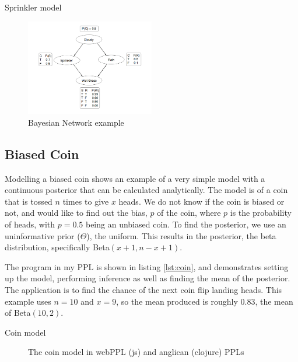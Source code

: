 \begin{listing}[!ht]
	\caption{Sprinkler model}
	\label{lst:sprinkler}
\end{listing}

\begin{figure}[!htb]
	\centering
	\includegraphics[width=0.5\textwidth]{figs/sprinkler-network.png}
	\caption{Bayesian Network example}
	\label{fig:sprinkler-network}
\end{figure}

\subsection{Biased Coin} \label{sec:coin} 
Modelling a biased coin shows an example of a very simple model with a continuous posterior that can be calculated analytically\cite{datasci}. 
% 
The model is of a coin that is tossed $n$ times to give $x$ heads. We do not know if the coin is biased or not, and would like to find out the bias, $p$ of the coin, where $p$ is the probability of heads, with $p=0.5$ being an unbiased coin.
% 
To find the posterior, we use an uninformative prior ($\Theta$), the uniform. This results in the posterior, the beta distribution, specifically Beta$(x+1,n-x+1)$.

The program in my PPL is shown in listing \ref{lst:coin}, and demonstrates setting up the model, performing inference as well as finding the mean of the posterior. The application is to find the chance of the next coin flip landing heads. This example uses $n=10$ and $x=9$, so the mean produced is roughly 0.83, the mean of Beta$(10,2)$.

\begin{listing}[!ht]
	\caption{Coin model}
	\label{lst:coin}
\end{listing}

\begin{figure}[!htb]
	\begin{minipage}{0.5\textwidth}
		\centering
	\end{minipage}
	\begin{minipage}{0.5\textwidth}
		\centering
	\end{minipage}
	\caption{The coin model in webPPL (js) and anglican (clojure) PPLs}
	\label{fig:compare-coin}
\end{figure}

